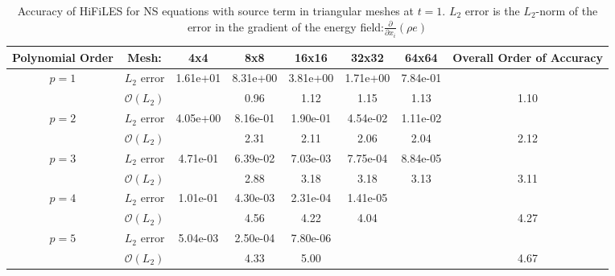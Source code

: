 \begin{table}[htbp]
\centering
\begin{tabular}{ c c c c c c c c} 
  
 Polynomial Order & Mesh: & 4x4 & 8x8 & 16x16 & 32x32 & 64x64 & Overall Order of Accuracy \\ 
 \hline 
 \multirow{2}{*}{$p = 1$} & $L_2$ error & 1.61e+01 & 8.31e+00 & 3.81e+00 & 1.71e+00 & 7.84e-01 &   \\ 
  
   & $\mathcal{O}(L_2)$ &   & 0.96 & 1.12 & 1.15 & 1.13 & 1.10 \\ 
 \hline 
 \multirow{2}{*}{$p = 2$} & $L_2$ error & 4.05e+00 & 8.16e-01 & 1.90e-01 & 4.54e-02 & 1.11e-02 &   \\ 
  
   & $\mathcal{O}(L_2)$ &   & 2.31 & 2.11 & 2.06 & 2.04 & 2.12 \\ 
 \hline 
 \multirow{2}{*}{$p = 3$} & $L_2$ error & 4.71e-01 & 6.39e-02 & 7.03e-03 & 7.75e-04 & 8.84e-05 &   \\ 
  
   & $\mathcal{O}(L_2)$ &   & 2.88 & 3.18 & 3.18 & 3.13 & 3.11 \\ 
 \hline 
 \multirow{2}{*}{$p = 4$} & $L_2$ error & 1.01e-01 & 4.30e-03 & 2.31e-04 & 1.41e-05 &  &   \\ 
  
   & $\mathcal{O}(L_2)$ &   & 4.56 & 4.22 & 4.04 &  & 4.27 \\ 
 \hline 
 \multirow{2}{*}{$p = 5$} & $L_2$ error & 5.04e-03 & 2.50e-04 & 7.80e-06 &   &   &   \\ 
  
   & $\mathcal{O}(L_2)$ &   & 4.33 & 5.00 &   &   & 4.67 \\ 
 \hline 
 \end{tabular}
\caption{Accuracy of HiFiLES for NS equations with source term in triangular meshes at $t = 1$. $L_2$ error is the $L_2$-norm of the error in the gradient of the energy field:$\frac{\partial}{\partial x_i} (\rho e)$}
\label{table:trisError2} 
 \end{table}
